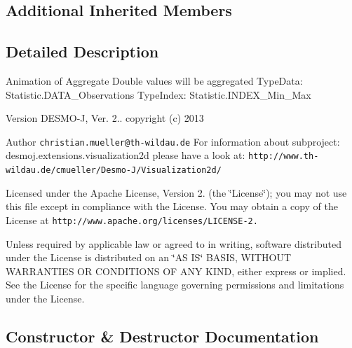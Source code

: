 \subsection*{Additional Inherited Members}


\subsection{Detailed Description}
Animation of Aggregate Double values will be aggregated Type\-Data\-: Statistic.\-D\-A\-T\-A\-\_\-\-Observations Type\-Index\-: Statistic.\-I\-N\-D\-E\-X\-\_\-\-Min\-\_\-\-Max

\begin{DoxyVersion}{Version}
D\-E\-S\-M\-O-\/\-J, Ver. 2.. copyright (c) 2013 
\end{DoxyVersion}
\begin{DoxyAuthor}{Author}
{\tt christian.\-mueller@th-\/wildau.\-de} For information about subproject\-: desmoj.\-extensions.\-visualization2d please have a look at\-: {\tt http\-://www.\-th-\/wildau.\-de/cmueller/\-Desmo-\/\-J/\-Visualization2d/}
\end{DoxyAuthor}
Licensed under the Apache License, Version 2. (the \char`\"{}\-License\char`\"{}); you may not use this file except in compliance with the License. You may obtain a copy of the License at {\tt http\-://www.\-apache.\-org/licenses/\-L\-I\-C\-E\-N\-S\-E-\/2.}

Unless required by applicable law or agreed to in writing, software distributed under the License is distributed on an \char`\"{}\-A\-S I\-S\char`\"{} B\-A\-S\-I\-S, W\-I\-T\-H\-O\-U\-T W\-A\-R\-R\-A\-N\-T\-I\-E\-S O\-R C\-O\-N\-D\-I\-T\-I\-O\-N\-S O\-F A\-N\-Y K\-I\-N\-D, either express or implied. See the License for the specific language governing permissions and limitations under the License. 

\subsection{Constructor \& Destructor Documentation}
